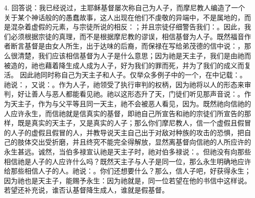 4. 回答说：我已经说过，主耶稣基督屡次称自己为人子，而摩尼教人编造了一个关于某个神话般的的愚蠢故事，这人出现在他们不虔敬的异端中，不是属地的，而是混杂着虚假的元素，与宗徒所说的相反：；并且宗徒仔细警告我们：。因此，我们必须根据宗徒的真理，而不是根据摩尼教的谬误，相信基督为人子。既然福音作者断言基督是由女人所生，出于达味的后裔，而保禄在写给弟茂德的信中说：，那么很清楚，我们应该相信基督为人子是什么意思；因为祂是天主子，我们是由祂而被造的，祂也藉着降生成人成为人子，好为我们的罪而死，并为了我们的成义而复活。 因此祂同时称自己为天主子和人子。仅举众多例子中的一个，在中记载：。祂说：，又说：。作为人子，祂领受了执行审判的权柄，因为祂将以人的形态来审判，好让善人与恶人都能看见祂。祂以这形态升了天，门徒们听见那声音说：。作为天主子，作为与父平等且同一天主，祂不会被恶人看见，因为。既然祂向信祂的人应许永生，而信祂就是信真实的基督，即祂自己所宣告和祂的宗徒们所宣告的那样，既是真实的天主子，又是真实的人子；那么你们摩尼教人，信一个虚假且假冒的人子的虚假且假冒的人，并教导说天主自己出于对敌对种族的攻击的恐惧，把自己的肢体交出受折磨，并且终究不能完全得解放，显然离基督向信祂的人所应许的永生甚远。诚然，当伯多禄宣认祂是天主子时，祂对伯多禄说：。但祂没有向那些相信祂是人子的人应许什么吗？既然天主子与人子是同一位，那么永生明确地应许给那些相信人子的人。祂说：。你们还想要什么？那么，信人子吧，好获得永生；因为祂也是天主子，能赐予永生：因为祂就是，同一位若望在他的书信中这样说。若望还补充说，谁否认基督降生成人，谁就是假基督。\par

